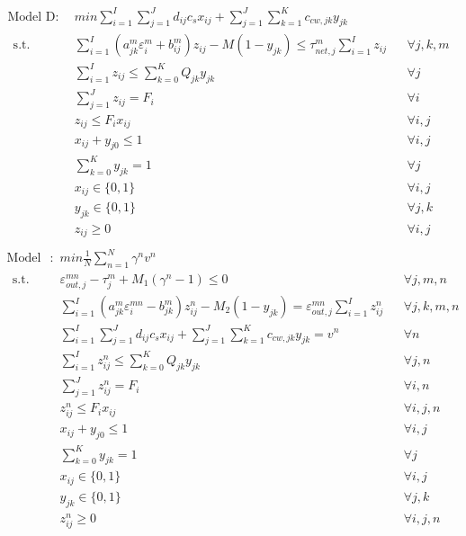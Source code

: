 \documentclass[preprint,12pt,authoryear]{elsarticle}
\begin{document}
\begin{equation*}\label{modelD}
\begin{aligned}
	\text{Model D}:~~&min \sum_{i=1}^{I}\sum_{j=1}^{J}d_{ij}c_s x_{ij} + \sum_{j=1}^{J}\sum_{k=1}^{K}c_{cw,jk}y_{jk}\\~~
	\mbox{s.t.}~~
	&\sum_{i=1}^{I} (a_{jk}^m \varepsilon_i^m + b_{ij}^m) z_{ij} - M(1 - y_{jk}) \leq \tau_{net,j}^m \sum_{i=1}^I z_{ij}  && \forall j,k,m\\
 	&\sum_{i=1}^{I} z_{ij} \leq \sum_{k=0}^K Q_{jk} y_{jk} && \forall j\\
	&\sum_{j=1}^J z_{ij} = F_i && \forall i\\
	&z_{ij} \leq F_i x_{ij} && \forall i,j\\
	&x_{ij} + y_{j0} \leq 1 && \forall i,j\\
	&\sum_{k=0}^{K}y_{jk} = 1&&\forall j\\
	&x_{ij} \in \{0,1\}&&\forall i,j\\
	&y_{jk} \in \{0,1\}&&\forall j,k\\
	&z_{ij} \geq 0&&\forall i,j\\ 
\end{aligned}
\end{equation*}
\pagebreak
\begin{equation*}\label{modelS}
\begin{aligned}
	\text{Model S}:~~&min \frac{1}{N}\sum_{n=1}^N \gamma^n v^n\\~~
	\mbox{s.t.}~~
	&\varepsilon_{out,j}^{mn} - \tau_j^m + M_1(\gamma^n - 1) \leq 0 && \forall j,m,n\\
	&\sum_{i=1}^{I} (a_{jk}^m \varepsilon_i^{mn} - b_{jk}^m) z_{ij}^n - M_2(1 - y_{jk}) = \varepsilon_{out,j}^{mn} \sum_{i=1}^I z_{ij}^n  && \forall j,k,m,n\\
	&\sum_{i=1}^{I}\sum_{j=1}^{J}d_{ij}c_s x_{ij} + \sum_{j=1}^{J}\sum_{k=1}^{K}c_{cw,jk}y_{jk} = v^n && \forall n\\
 	&\sum_{i=1}^{I} z_{ij}^n \leq \sum_{k=0}^K Q_{jk} y_{jk} && \forall j,n\\
	&\sum_{j=1}^J z_{ij}^n = F_i && \forall i,n\\
	&z_{ij}^n \leq F_i x_{ij} && \forall i,j,n\\
	&x_{ij} + y_{j0} \leq 1 && \forall i,j\\
	&\sum_{k=0}^{K}y_{jk} = 1&&\forall j\\
	&x_{ij} \in \{0,1\}&&\forall i,j\\
	&y_{jk} \in \{0,1\}&&\forall j,k\\
	&z_{ij}^n \geq 0&&\forall i,j,n\\ 
\end{aligned}
\end{equation*}
\newpage
\end{document}
